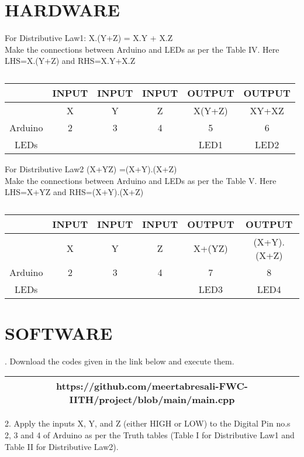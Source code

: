 \documentclass[conference]{IEEEtran}
\begin{document}
\section{HARDWARE}
\begin{flushleft}
For Distributive Law1: X.(Y+Z) = X.Y + X.Z \\
Make the connections between Arduino and LEDs as per the Table IV. Here LHS=X.(Y+Z) and RHS=X.Y+X.Z\\

\begin{table}[h]
\begin{tabular}{|c | c | c | c | c | c |} \hline
 & \textbf{INPUT} & \textbf{INPUT} & \textbf{INPUT} & \textbf{OUTPUT} & \textbf{OUTPUT} \\\hline
 & X & Y & Z & X(Y+Z) & XY+XZ \\ \hline
Arduino & 2 & 3 & 4 & 5 & 6 \\ \hline
LEDs &  &  &  & LED1 & LED2 \\ \hline
\end{tabular}
\caption{\label{tab:widgets}}
\end{table}
\end{flushleft}
\begin{flushleft}
For Distributive Law2 (X+YZ) =(X+Y).(X+Z) \\
Make the connections between Arduino and LEDs as per the Table V. Here LHS=X+YZ and RHS=(X+Y).(X+Z) \\
\end{flushleft}
\begin{table}[h]
\begin{tabular}{|c | c | c | c | c | c |} \hline
 & \textbf{INPUT} & \textbf{INPUT} & \textbf{INPUT} & \textbf{OUTPUT} & \textbf{OUTPUT} \\\hline
 & X & Y & Z & X+(YZ) & (X+Y).(X+Z) \\ \hline
Arduino & 2 & 3 & 4 & 7 & 8 \\ \hline
LEDs &  &  &  & LED3 & LED4 \\ \hline
\end{tabular}
\caption{\label{tab:widgets}}
\end{table}

\section{SOFTWARE}
. Download the codes given in the link below and execute them.\\

\begin{table}[h]
\centering
\begin{tabular}{| c |} \hline
 \rule{0pt}{20pt} https://github.com/meertabresali-FWC-IITH/project/blob/main/main.cpp \\\hline
\end{tabular}
\end{table}
\begin{flushleft}
2. Apply the inputs X, Y, and Z (either HIGH or LOW) to the Digital Pin no.s 2, 3 and 4 of Arduino as per the Truth tables (Table I for Distributive Law1 and Table II for Distributive Law2).
\end{flushleft}
\end{document}
